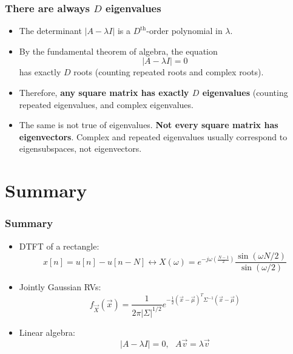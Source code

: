\documentclass{beamer}
\begin{document}
\begin{frame}
  \frametitle{There are always $D$ eigenvalues}
  \begin{itemize}
  \item The determinant $|A-\lambda I|$ is a $D^{\textrm{th}}$-order polynomial in $\lambda$.
  \item By the fundamental theorem of algebra, the equation
    \[
    |A-\lambda I|=0
    \]
    has exactly $D$ roots (counting repeated roots and complex roots).
  \item Therefore, {\bf any square matrix has exactly $D$ eigenvalues}
    (counting repeated eigenvalues, and complex eigenvalues.
  \item The same is not true of eigenvalues.  {\bf Not every square
    matrix has eigenvectors}.  Complex and repeated eigenvalues
    usually correspond to eigensubspaces, not eigenvectors.
  \end{itemize}
\end{frame}

\section{Summary}
\setcounter{subsection}{1}

\begin{frame}
  \frametitle{Summary}
  \begin{itemize}
    \item DTFT of a rectangle: 
      \[
      x[n]=u[n]-u[n-N] \leftrightarrow
      X(\omega)=e^{-j\omega\left(\frac{N-1}{2}\right)}\frac{\sin(\omega N/2)}{\sin(\omega/2)}
      \]
    \item Jointly Gaussian RVs:
      \[
      f_{\vec{X}}(\vec{x}) = \frac{1}{2\pi|\Sigma|^{1/2}}
      e^{-\frac{1}{2}(\vec{x}-\vec\mu)^T\Sigma^{-1}(\vec{x}-\vec\mu)}
      \]
    \item Linear algebra:
      \[
      |A-\lambda I|=0,~~~A\vec{v}=\lambda\vec{v}
      \]
  \end{itemize}
\end{frame}
\end{document}

